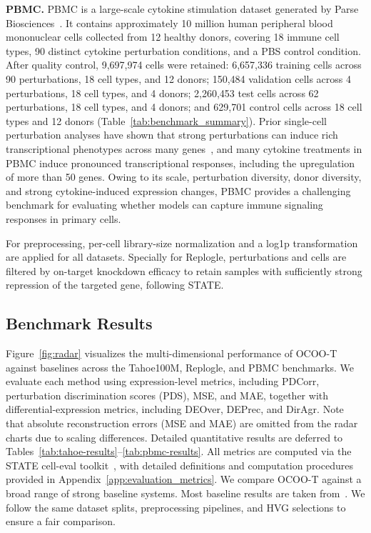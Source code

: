 \documentclass[11pt]{article}
\begin{document}
\textbf{PBMC.} PBMC is a large-scale cytokine stimulation dataset generated by Parse Biosciences~\cite{parsebiosciences2023pbmc}. It contains approximately 10 million human peripheral blood mononuclear cells collected from 12 healthy donors, covering 18 immune cell types, 90 distinct cytokine perturbation conditions, and a PBS control condition. After quality control, 9,697,974 cells were retained: 6,657,336 training cells across 90 perturbations, 18 cell types, and 12 donors; 150,484 validation cells across 4 perturbations, 18 cell types, and 4 donors; 2,260,453 test cells across 62 perturbations, 18 cell types, and 4 donors; and 629,701 control cells across 18 cell types and 12 donors (Table~\ref{tab:benchmark_summary}). Prior single-cell perturbation analyses have shown that strong perturbations can induce rich transcriptional phenotypes across many genes~\cite{norman2019exploring}, and many cytokine treatments in PBMC induce pronounced transcriptional responses, including the upregulation of more than 50 genes. Owing to its scale, perturbation diversity, donor diversity, and strong cytokine-induced expression changes, PBMC provides a challenging benchmark for evaluating whether models can capture immune signaling responses in primary cells.

For preprocessing, per-cell library-size normalization and a log1p transformation are applied for all datasets. Specially for Replogle, perturbations and cells are filtered by on-target knockdown efficacy to retain samples with sufficiently strong repression of the targeted gene, following STATE.

\subsection{Benchmark Results}

Figure~\ref{fig:radar} visualizes the multi-dimensional performance of OCOO-T against baselines across the Tahoe100M, Replogle, and PBMC benchmarks. We evaluate each method using expression-level metrics, including PDCorr, perturbation discrimination scores (PDS), MSE, and MAE, together with differential-expression metrics, including DEOver, DEPrec, and DirAgr. Note that absolute reconstruction errors (MSE and MAE) are omitted from the radar charts due to scaling differences. Detailed quantitative results are deferred to Tables~\ref{tab:tahoe-results}--\ref{tab:pbmc-results}. All metrics are computed via the STATE cell-eval toolkit~\cite{arcinstitute2026celleval}, with detailed definitions and computation procedures provided in Appendix~\ref{app:evaluation_metrics}. We compare OCOO-T against a broad range of strong baseline systems. Most baseline results are taken from~\cite{yuan2026perturbdiff}. We follow the same dataset splits, preprocessing pipelines, and HVG selections to ensure a fair comparison.
\end{document}

